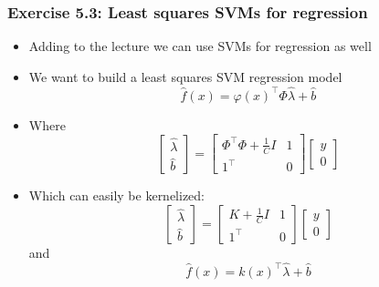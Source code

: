 \documentclass[10pt,aspectratio=169,handout]{beamer}
\begin{document}
\begin{frame}
    \frametitle{Exercise 5.3: Least squares SVMs for regression}

    \begin{itemize}
        \item Adding to the lecture we can use SVMs for regression as well
        \item We want to build a least squares SVM regression model \[\hat{f}(x)=\varphi(x)^\intercal \Phi\hat{\lambda}+\hat{b}\]
        \item Where \[
            \begin{bmatrix}
                \hat{\lambda}\\
                \hat{b}
            \end{bmatrix}=\begin{bmatrix}
                \Phi^\intercal\Phi + \frac{1}{C}I & 1\\
                1^\intercal & 0
            \end{bmatrix}\begin{bmatrix}
                y\\0
            \end{bmatrix}    
        \]
        \item Which can easily be kernelized: \[
            \begin{bmatrix}
                \hat{\lambda}\\
                \hat{b}
            \end{bmatrix}=\begin{bmatrix}
                K + \frac{1}{C}I & 1\\
                1^\intercal & 0
            \end{bmatrix}\begin{bmatrix}
                y\\0
            \end{bmatrix}       
        \] and \[\hat{f}(x)=k(x)^\intercal\hat{\lambda}+\hat{b}\]
    \end{itemize}

\end{frame}
\end{document}
